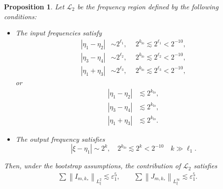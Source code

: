 \documentclass[reqno,english,11pt]{amsart}
\newcommand{\eps}{\varepsilon}
\newcommand{\snorm}[1]{\left\|#1\right\|}
\newtheorem{proposition}[theorem]{Proposition}
\theoremstyle{definition}
\numberwithin{equation}{section}
\begin{document}
\begin{proposition}\label{prop:STR_line_case_2}
Let $\mathcal{L}_2$ be the frequency region defined by the following conditions:
\begin{itemize}
    \item The input frequencies satisfy
\begin{align*}
  \left|\eta_1-\eta_2\right| &\sim 2^{\ell_1}, \quad  \ 2^{k_{\operatorname{lo}}} \lesssim 2^{\ell_1}<2^{-10},
  \\
  \left|\eta_3-\eta_4\right| &\sim 2^{\ell_2}, \quad  \ 2^{k_{\operatorname{lo}}} \lesssim 2^{\ell_2}<2^{-10},
  \\
  \left|\eta_1+\eta_3\right| &\sim 2^{\ell_3}, \quad  \ 2^{k_{\operatorname{lo}}} \lesssim 2^{\ell_3}<2^{-10},
\end{align*}
or
\begin{align*}
    \left|\eta_1-\eta_2\right| &\lesssim 2^{k_{\operatorname{lo}}},\\
    \left|\eta_3-\eta_4\right| &\lesssim 2^{k_{\operatorname{lo}}},\\
     \left|\eta_1+\eta_3\right| &\lesssim 2^{k_{\operatorname{lo}}}.
\end{align*}
    \item The output frequency satisfies 
    $$ |\xi-\eta_1|\sim 2^{k}, \quad 2^{k_{\operatorname{lo}}} \lesssim 2^{k}<2^{-10} \quad k \gg \ell_1.$$
\end{itemize}
Then, under the bootstrap assumptions, the contribution of $\mathcal{L}_2$ satisfies
    \begin{align*}
        \sum\snorm{I_{m,k_*}}_{L^2_\xi}\lesssim \eps_1^5,\qquad\sum\snorm{J_{m,k_*}}_{L^\infty_\xi}\lesssim \eps_1^5.
    \end{align*}
\end{proposition}
\end{document}
